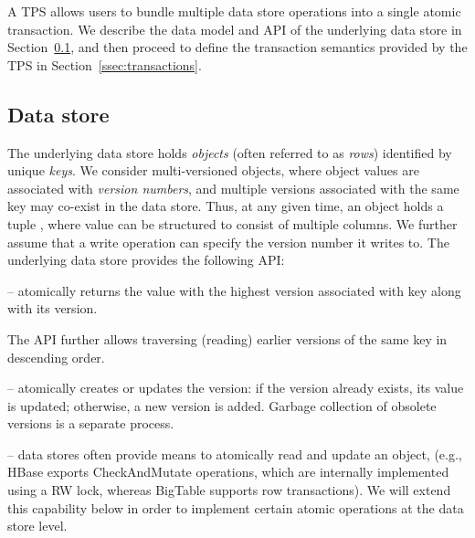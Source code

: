 

A TPS allows users to bundle multiple data store operations into a single atomic transaction. 
We describe the data model and API of the underlying data store in Section~\ref{ssec:data-model}, and 
then proceed to define  the transaction semantics provided by the TPS in Section~\ref{ssec:transactions}. 

\subsection{Data store}
\label{ssec:data-model}

The underlying data store holds  \emph{objects} (often referred to as \emph{rows}) identified by unique \emph{keys}.
We consider multi-versioned objects, where object values are associated with \emph{version numbers}, and
multiple versions associated with the same key may co-exist in the data store.
Thus, at any given time, an object holds a tuple , where value
can be structured to consist of multiple columns.
We further assume that a write operation can specify the version number it writes to.
The underlying data store provides the following API:
\begin{description}
\item [] -- atomically returns the value with
the highest version associated with key along with its version.
\item The API further allows traversing (reading) earlier versions of the same
key in descending order.
\item [\code{write(key,value,version)}] -- atomically creates or updates the version:
if the version already exists, its value is updated;
otherwise, a new version is added. Garbage collection of obsolete versions is a separate
process.
\item [Read-modify-write] --  data stores often provide means to atomically read and
update an object, (e.g., HBase exports CheckAndMutate operations, which are 
internally implemented using a RW lock, whereas BigTable supports row transactions). We
will extend this capability below in order to implement certain atomic
operations at the data store level.
\end{description}

